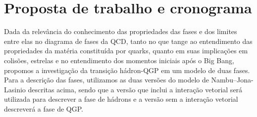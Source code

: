 





\section{Proposta de trabalho e cronograma}

Dada da relevância do conhecimento das propriedades das fases e dos limites entre elas no diagrama de fases da QCD, tanto no que tange ao entendimento das propriedades da matéria constituída por quarks, quanto em suas implicações em colisões, estrelas e no entendimento dos momentos iniciais após o Big Bang, propomos a investigação da transição hádron-QGP em um modelo de duas fases. Para a descrição das fases, utilizamos as duas versões do modelo de Nambu--Jona-Lasinio descritas acima, sendo que a versão que inclui a interação vetorial será utilizada para descrever a fase de hádrons e a versão sem a interação vetorial descreverá a fase de QGP.

